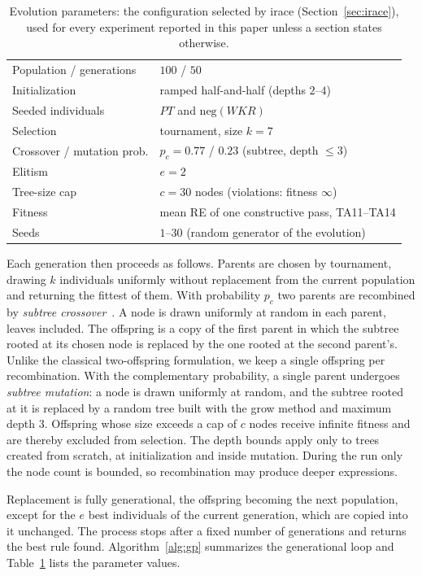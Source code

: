 \documentclass[review,authoryear,11pt]{elsarticle}
\begin{document}
\begin{table}[t]
\centering\small
\caption{Evolution parameters: the configuration selected by irace
(Section~\ref{sec:irace}), used for every experiment reported in this
paper unless a section states otherwise.}
\label{tab:gpparams}
\begin{tabular}{ll}
\toprule
Population / generations & $100$ / $50$ \\
Initialization & ramped half-and-half (depths $2$--$4$) \\
Seeded individuals & $\mathit{PT}$ and $\mathrm{neg}(\mathit{WKR})$ \\
Selection & tournament, size $k = 7$ \\
Crossover / mutation prob. & $p_c = 0.77$ / $0.23$ (subtree, depth $\le 3$) \\
Elitism & $e = 2$ \\
Tree-size cap & $c = 30$ nodes (violations: fitness $\infty$) \\
Fitness & mean RE of one constructive pass, TA11--TA14 \\
Seeds & $1$--$30$ (random generator of the evolution) \\
\bottomrule
\end{tabular}
\end{table}

Each generation then proceeds as follows. Parents are chosen by
tournament, drawing $k$ individuals uniformly without replacement from
the current population and returning the fittest of them. With
probability $p_c$ two parents are recombined by \emph{subtree
crossover}~\citep{Koza1992,Poli2008}. A node is drawn uniformly at
random in each parent, leaves included. The offspring is a copy of the
first parent in which the subtree rooted at its chosen node is replaced
by the one rooted at the second parent's. Unlike the classical
two-offspring formulation, we keep a single offspring per recombination.
With the complementary probability, a single parent undergoes
\emph{subtree mutation}: a node is drawn uniformly at random, and the
subtree rooted at it is replaced by a random tree built with the grow
method and maximum depth $3$. Offspring whose size exceeds a cap of $c$
nodes receive infinite fitness and are thereby excluded from selection.
The depth bounds apply only to trees created from scratch, at
initialization and inside mutation. During the run only the node count
is bounded, so recombination may produce deeper expressions.

Replacement is fully generational, the offspring becoming the next
population, except for the $e$ best individuals of the current
generation, which are copied into it unchanged. The process stops after
a fixed number of generations and returns the best rule found.
Algorithm~\ref{alg:gp} summarizes the generational loop and
Table~\ref{tab:gpparams} lists the parameter values.
\end{document}
